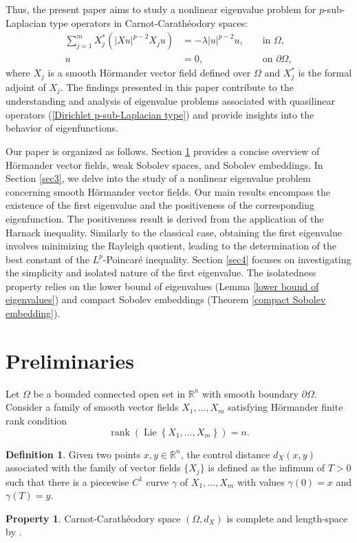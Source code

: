 \documentclass[a4paper,12pt,reqno]{amsart}
\renewcommand\eqref[1]{(\ref{#1})} %
\numberwithin{equation}{section}
\theoremstyle{plain}
\theoremstyle{definition}
\newtheorem{defn}[thm]{Definition}
\newtheorem{property}[thm]{Property}
\newcommand{\Rn}{\mathbb R^{n}}
\begin{document}
Thus, the present paper aims to study a nonlinear eigenvalue problem for $p$-sub-Laplacian type operators in Carnot-Carath\'eodory spaces:
\begin{equation}\label{Dirichlet p-sub-Laplacian type}
\begin{aligned}
\sum_{j=1}^{m}X_{j}^{*}\left(\left|X u\right|^{p-2} X_{j}u\right)&=-\lambda|u|^{p-2} u,  &&\text { in } \Omega, \\
u&=0,
&&\text { on } \partial \Omega,
\end{aligned}
\end{equation}
where $X_{j}$ is a smooth  H\"ormander vector field defined over $\Omega$ and $X_{j}^{*}$ is the formal adjoint of $X_{j}$. The findings presented in this paper contribute to the understanding and analysis of eigenvalue problems associated with quasilinear operators \eqref{Dirichlet p-sub-Laplacian type} and provide insights into the behavior of eigenfunctions.

Our paper is organized as follows. Section \ref{sec2} provides a concise overview of H\"ormander vector fields, weak Sobolev spaces, and Sobolev embeddings. In Section \ref{sec3}, we delve into the study of a nonlinear eigenvalue problem concerning smooth H\"ormander vector fields. Our main results encompass the existence of the first eigenvalue and the positiveness of the corresponding eigenfunction. The positiveness result is derived from the application of the Harnack inequality. Similarly to the classical case, obtaining the first eigenvalue involves minimizing the Rayleigh quotient, leading to the determination of the best constant of the $L^{p}$-Poincar\'e inequality. Section \ref{sec4} focuses on investigating the simplicity and isolated nature of the first eigenvalue. The isolatedness property relies on the lower bound of eigenvalues (Lemma \ref{lower bound of eigenvalues}) and compact Sobolev embeddings (Theorem \ref{compact Sobolev embedding}).

\section{Preliminaries}\label{sec2}
Let $\Omega$ be a bounded connected open set in $\mathbb{R}^{n}$ with smooth boundary $\partial\Omega$. Consider a family of smooth vector fields $X_{1}, \ldots, X_{m}$  satisfying H\"ormander finite rank condition
\begin{equation*}
\operatorname{rank}\left(\operatorname{Lie}\left\{X_{1}, \ldots, X_{m}\right\}\right)=n.
\end{equation*}
\begin{defn}
Given two points $x,y\in \Rn$,
the control distance $d_X(x, y)$ associated with the family of vector fields  $\{X_j\}$ is defined as the infimum of $T>0$ such that there is a piecewise $C^{1}$   curve $\gamma$ of $X_1, \ldots, X_m$ with values $\gamma(0)=x$ and $\gamma(T)=y$.   
\end{defn}
\begin{property}\label{Property 1}
Carnot-Carath\'eodory space $(\Omega, d_X)$ is complete and length-space by \cite[Lemma 3.1]{Str1986}.   
\end{property}
\end{document}
